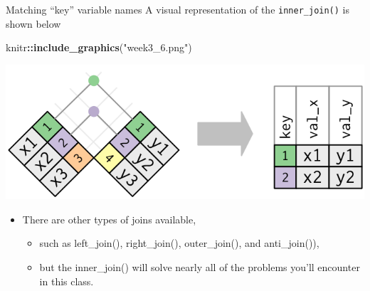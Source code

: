 \documentclass[
  ignorenonframetext,
]{beamer}
\newenvironment{Shaded}{\begin{snugshade}}{\end{snugshade}}
\newcommand{\FunctionTok}[1]{\textcolor[rgb]{0.13,0.29,0.53}{\textbf{#1}}}
\newcommand{\NormalTok}[1]{#1}
\newcommand{\SpecialCharTok}[1]{\textcolor[rgb]{0.81,0.36,0.00}{\textbf{#1}}}
\newcommand{\StringTok}[1]{\textcolor[rgb]{0.31,0.60,0.02}{#1}}
\providecommand{\tightlist}{%
  \setlength{\itemsep}{0pt}\setlength{\parskip}{0pt}}
\begin{document}
\begin{frame}[fragile]{Matching ``key'' variable names}
\protect\hypertarget{matching-key-variable-names-1}{}
A visual representation of the \texttt{inner\_join()} is shown below

\begin{Shaded}
\begin{Highlighting}[]
\NormalTok{knitr}\SpecialCharTok{::}\FunctionTok{include\_graphics}\NormalTok{(}\StringTok{"week3\_6.png"}\NormalTok{)}
\end{Highlighting}
\end{Shaded}

\begin{center}\includegraphics[width=0.6\linewidth,height=0.4\textheight]{week3_6} \end{center}

\begin{itemize}
\item
  There are other types of joins available,

  \begin{itemize}
  \tightlist
  \item
    such as left\_join(), right\_join(), outer\_join(), and
    anti\_join()),
  \item
    but the inner\_join() will solve nearly all of the problems you'll
    encounter in this class.
  \end{itemize}
\end{itemize}
\end{frame}
\end{document}
